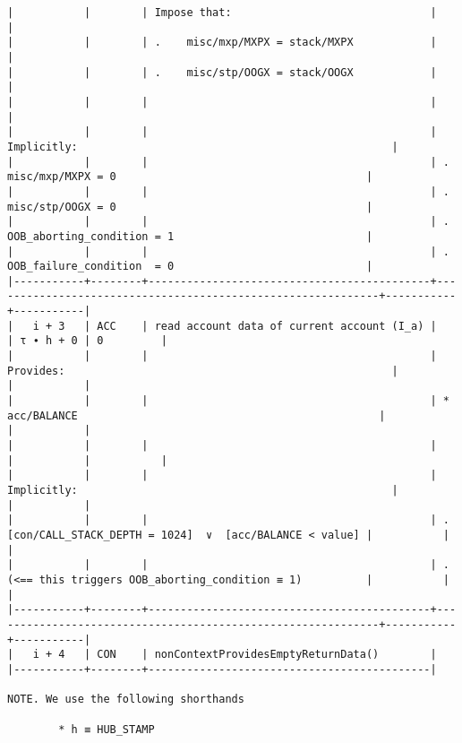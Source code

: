 \documentclass[varwidth=\maxdimen,margin=0.5cm,multi={verbatim}]{standalone}
\begin{document}
\begin{verbatim}
|           |        | Impose that:                               |                                                             |
|           |        | .    misc/mxp/MXPX = stack/MXPX            |                                                             |
|           |        | .    misc/stp/OOGX = stack/OOGX            |                                                             |
|           |        |                                            |                                                             |
|           |        |                                            | Implicitly:                                                 |
|           |        |                                            | .   misc/mxp/MXPX = 0                                       |
|           |        |                                            | .   misc/stp/OOGX = 0                                       |
|           |        |                                            | .   OOB_aborting_condition = 1                              |
|           |        |                                            | .   OOB_failure_condition  = 0                              |
|-----------+--------+--------------------------------------------+-------------------------------------------------------------+-----------+-----------|
|   i + 3   | ACC    | read account data of current account (I_a) |                                                             | τ ∙ h + 0 | 0         |
|           |        |                                            | Provides:                                                   |           |           |
|           |        |                                            | * acc/BALANCE                                               |           |           |
|           |        |                                            |                                                             |           |           |
|           |        |                                            | Implicitly:                                                 |           |           |
|           |        |                                            | .   [con/CALL_STACK_DEPTH = 1024]  ∨  [acc/BALANCE < value] |           |           |
|           |        |                                            | .   (<== this triggers OOB_aborting_condition ≡ 1)          |           |           |
|-----------+--------+--------------------------------------------+-------------------------------------------------------------+-----------+-----------|
|   i + 4   | CON    | nonContextProvidesEmptyReturnData()        |
|-----------+--------+--------------------------------------------|

NOTE. We use the following shorthands

        * h ≡ HUB_STAMP


\end{verbatim}
\end{document}
